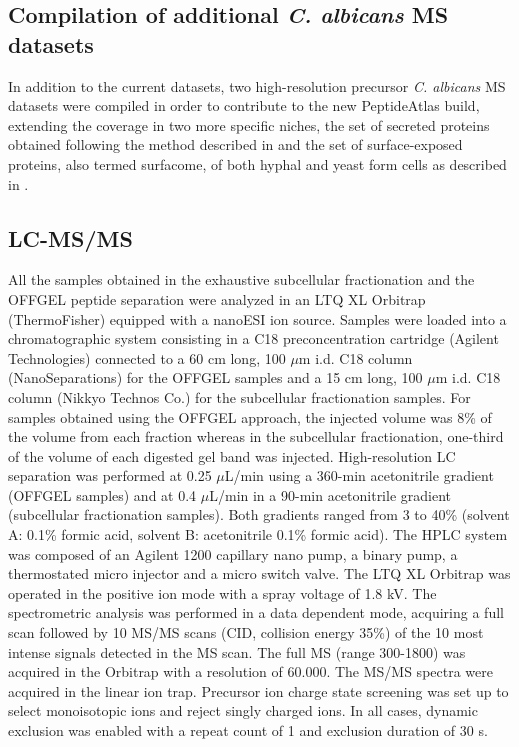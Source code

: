 \subsection*{Compilation of additional \textit{C. albicans} MS datasets}

In addition to the current datasets, two high-resolution precursor \textit{C. albicans} MS datasets
were compiled in order to contribute to the new PeptideAtlas build, extending the coverage in
two more specific niches, the set of secreted proteins obtained following the method
described in \citep{Gil-Bona2015a} and the set of surface-exposed proteins, also termed surfacome, of both
hyphal and yeast form cells as described in \citep{Gil-Bona2015}.


\subsection*{LC-MS/MS}

All the samples obtained in the exhaustive subcellular fractionation and the OFFGEL peptide
separation were analyzed in an LTQ XL Orbitrap (ThermoFisher) equipped with a nanoESI
ion source. Samples were loaded into a chromatographic system consisting in a C18
preconcentration cartridge (Agilent Technologies) connected to a 60 cm long, 100 $\mu$m i.d.
C18 column (NanoSeparations) for the OFFGEL samples and a 15 cm long, 100 $\mu$m i.d. C18
column (Nikkyo Technos Co.) for the subcellular fractionation samples.
For samples obtained using the OFFGEL approach, the injected volume was 8\% of the
volume from each fraction whereas in the subcellular fractionation, one-third of the volume of
each digested gel band was injected.
High-resolution LC separation was performed at 0.25 $\mu$L/min using a 360-min acetonitrile
gradient (OFFGEL samples) and at 0.4 $\mu$L/min in a 90-min acetonitrile gradient (subcellular
fractionation samples). Both gradients ranged from 3 to 40\% (solvent A: 0.1\% formic acid,
solvent B: acetonitrile 0.1\% formic acid). The HPLC system was composed of an Agilent
1200 capillary nano pump, a binary pump, a thermostated micro injector and a micro switch
valve. The LTQ XL Orbitrap was operated in the positive ion mode with a spray voltage of 1.8
kV. The spectrometric analysis was performed in a data dependent mode, acquiring a full
scan followed by 10 MS/MS scans (CID, collision energy 35\%) of the 10 most intense signals
detected in the MS scan. The full MS (range 300-1800) was acquired in the Orbitrap with a
resolution of 60.000. The MS/MS spectra were acquired in the linear ion trap. Precursor ion
charge state screening was set up to select monoisotopic ions and reject singly charged
ions. In all cases, dynamic exclusion was enabled with a repeat count of 1 and exclusion
duration of 30 s.


